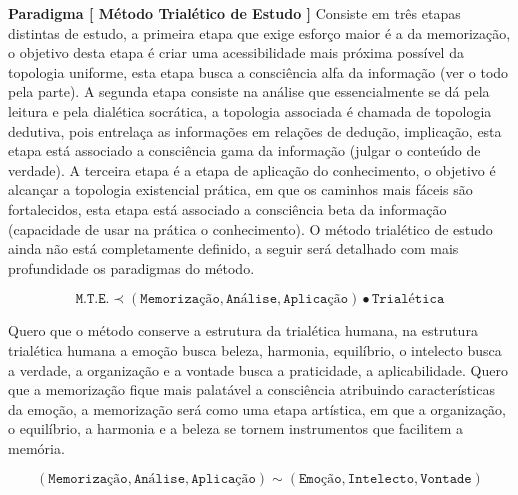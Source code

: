\documentclass[10pt,a4paper]{report}
\begin{document}
% 
\hspace{\baselineskip}

\textbf{Paradigma [ Método Trialético de Estudo ]} Consiste em três etapas distintas de estudo, a primeira etapa que exige esforço maior é a da memorização, o objetivo desta etapa é criar uma acessibilidade mais próxima possível da topologia uniforme, esta etapa busca a consciência alfa da informação (ver o todo pela parte). A segunda etapa consiste na análise que essencialmente se dá pela leitura e pela dialética socrática, a topologia associada é chamada de topologia dedutiva, pois entrelaça as informações em relações de dedução, implicação, esta etapa está associado a consciência gama da informação (julgar o conteúdo de verdade). A terceira etapa é a etapa de aplicação do conhecimento, o objetivo é alcançar a topologia existencial prática, em que os caminhos mais fáceis são fortalecidos, esta etapa está associado a consciência beta da informação (capacidade de usar na prática o conhecimento). O método trialético de estudo ainda não está completamente definido, a seguir será detalhado com mais profundidade os paradigmas do método.

$$ \texttt{M.T.E.} \prec ( \texttt{Memorização}, \texttt{Análise} , \texttt{Aplicação} ) \bullet \texttt{Trialética}$$

\hspace{\baselineskip}

Quero que o método conserve a estrutura da trialética humana, na estrutura trialética humana a emoção busca beleza, harmonia, equilíbrio, o intelecto busca a verdade, a organização e a vontade busca a praticidade, a aplicabilidade. Quero que a memorização fique mais palatável a consciência atribuindo características da emoção, a memorização será como uma etapa artística, em que a organização, o equilíbrio, a harmonia e a beleza se tornem instrumentos que facilitem a memória.

$$ (\texttt{Memorização}, \texttt{Análise}, \texttt{Aplicação}) \sim (\texttt{Emoção}, \texttt{Intelecto}, \texttt{Vontade}) $$

\hspace{\baselineskip}

% 
\end{document}
